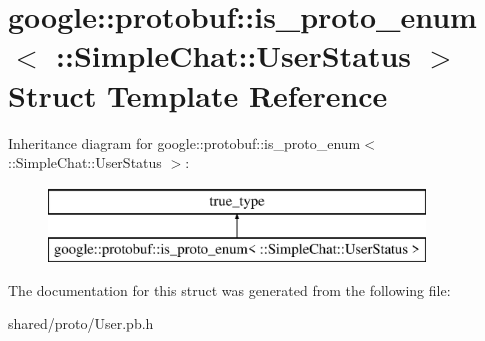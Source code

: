 \hypertarget{structgoogle_1_1protobuf_1_1is__proto__enum_3_01_1_1SimpleChat_1_1UserStatus_01_4}{\section{google\-:\-:protobuf\-:\-:is\-\_\-proto\-\_\-enum$<$ \-:\-:Simple\-Chat\-:\-:User\-Status $>$ Struct Template Reference}
\label{structgoogle_1_1protobuf_1_1is__proto__enum_3_01_1_1SimpleChat_1_1UserStatus_01_4}
}
Inheritance diagram for google\-:\-:protobuf\-:\-:is\-\_\-proto\-\_\-enum$<$ \-:\-:Simple\-Chat\-:\-:User\-Status $>$\-:\begin{figure}[H]
\begin{center}
\leavevmode
\includegraphics[height=2.000000cm]{structgoogle_1_1protobuf_1_1is__proto__enum_3_01_1_1SimpleChat_1_1UserStatus_01_4}
\end{center}
\end{figure}


The documentation for this struct was generated from the following file\-:\begin{DoxyCompactItemize}
\item 
shared/proto/User.\-pb.\-h\end{DoxyCompactItemize}
